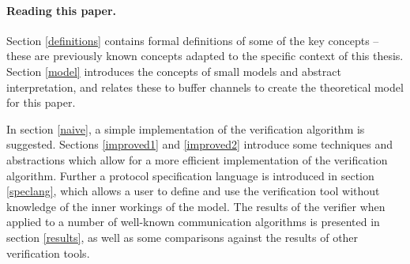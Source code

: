 \paragraph{Reading this paper.} Section \ref{definitions} contains formal definitions of some of the key concepts -- these are previously known concepts adapted to the specific context of this thesis. Section \ref{model} introduces the concepts of small models and abstract interpretation, and relates these to buffer channels to create the theoretical model for this paper. 

In section \ref{naive}, a simple implementation of the verification algorithm is suggested. Sections \ref{improved1} and \ref{improved2} introduce some techniques and abstractions which allow for a more efficient implementation of the verification algorithm. Further a protocol specification language is introduced in section \ref{speclang}, which allows a user to define and use the verification tool without knowledge of the inner workings of the model. The results of the verifier when applied to a number of well-known communication algorithms is presented in section \ref{results}, as well as some comparisons against the results of other verification tools.





